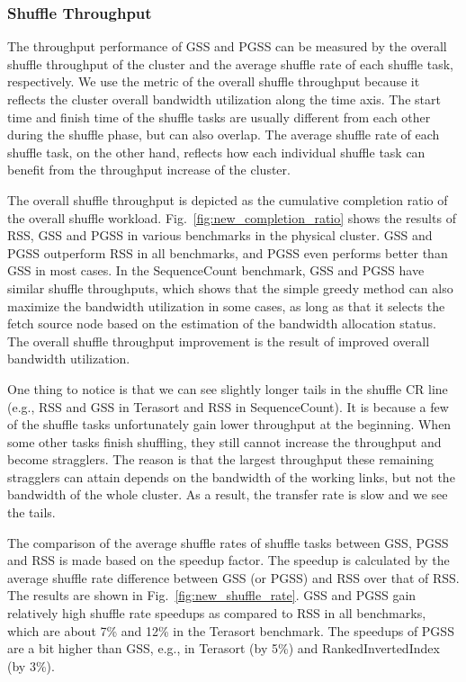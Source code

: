 \documentclass[10pt,journal,compsoc]{IEEEtran}
\begin{document}
\subsubsection{Shuffle Throughput}
The throughput performance of GSS and PGSS can be measured by the overall shuffle
throughput of the cluster
and the average shuffle rate of each shuffle task, respectively. 
We use the metric of the overall shuffle throughput because it
reflects the cluster overall bandwidth utilization along the time axis.
The start time and finish time of the shuffle tasks are usually different from each other during the shuffle phase, but can also overlap. 
The average shuffle rate of each shuffle task, on the other hand, reflects how each individual shuffle task can benefit from the throughput increase of the cluster.

The overall shuffle throughput is depicted as the cumulative
completion ratio of the overall shuffle workload.
Fig.~\ref{fig:new_completion_ratio} shows the results of RSS, GSS
and PGSS in various benchmarks in the physical cluster.
GSS and PGSS outperform RSS in all benchmarks, 
and PGSS even performs better than GSS in most cases. 
In the SequenceCount benchmark, GSS and PGSS have similar shuffle
throughputs, %
which shows that the simple greedy method can also maximize the
bandwidth utilization in some cases,
as long as that it selects the fetch source node based on the estimation of the bandwidth allocation status. 
The overall shuffle throughput improvement is the result of improved overall bandwidth utilization.

One thing to notice is that we can see slightly longer tails in the shuffle CR line (e.g., RSS and GSS in Terasort and RSS in SequenceCount). 
It is because a few of the shuffle tasks unfortunately gain lower throughput at the beginning. When some other tasks finish shuffling, they still cannot increase the throughput and become stragglers. The reason is that the largest throughput these remaining stragglers can attain depends on the bandwidth of the working links, but not the bandwidth of the whole cluster. As a result, the transfer rate is slow and we see the tails.

The comparison of the average shuffle rates of shuffle tasks between GSS, PGSS and RSS is made based on the speedup factor. 
The speedup is calculated by the average shuffle rate difference between GSS (or PGSS) and RSS over that of RSS. 
The results are shown in Fig.~\ref{fig:new_shuffle_rate}.
GSS and PGSS gain relatively high shuffle rate speedups as compared to
RSS in all benchmarks, which are about 7\% and 12\% in the
Terasort benchmark.
The speedups of PGSS are a bit higher than GSS, e.g., in Terasort (by 5\%) and RankedInvertedIndex (by 3\%). 
\end{document}
